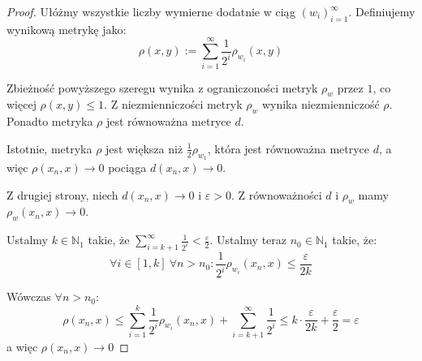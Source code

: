 \begin{thm}
\begin{proof}
    Ułóżmy wszystkie liczby wymierne dodatnie w ciąg $(w_i)_{i=1}^\infty$. Definiujemy wynikową metrykę jako:
    \[\rho(x, y) := \sum_{i=1}^\infty \frac{1}{2^i} \rho_{w_i}(x, y)\]
    
    Zbieżność powyższego szeregu wynika z ograniczoności metryk $\rho_w$ przez $1$, co więcej $\rho(x,y) \leq 1$. Z niezmienniczości metryk $\rho_w$ wynika niezmienniczość $\rho$. Ponadto metryka $\rho$ jest równoważna metryce $d$.
    
    Istotnie, metryka $\rho$ jest większa niż $\frac{1}{2} \rho_{w_1}$, która jest równoważna metryce $d$, a więc $\rho(x_n, x) \to 0$ pociąga $d(x_n, x) \to 0$.
    
    Z drugiej strony, niech $d(x_n, x) \to 0$ i $\varepsilon > 0$. Z równoważności $d$ i $\rho_w$ mamy $\rho_w(x_n, x) \to 0$.
    
    Ustalmy $k \in \mathbb{N}_1$ takie, że $\sum_{i=k+1}^\infty \frac{1}{2^i} < \frac{\varepsilon}{2}$.
    Ustalmy teraz $n_0 \in \mathbb{N}_1$ takie, że:
    \[\forall i \in [1,k]\ \forall n > n_0: \frac{1}{2^i} \rho_{w_i}(x_n, x) \leq \frac{\varepsilon}{2k}\]
    
    Wówczas $\forall n > n_0$:
    \[\rho(x_n, x) \leq \sum_{i=1}^k \frac{1}{2^i} \rho_{w_i}(x_n, x) + \sum_{i=k+1}^\infty \frac{1}{2^i} \leq k \cdot \frac{\varepsilon}{2k} + \frac{\varepsilon}{2} = \varepsilon\]
    a więc $\rho(x_n, x) \to 0$
    

\end{proof}
\end{thm}
